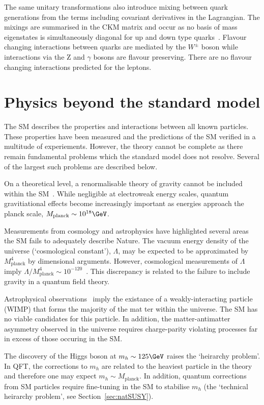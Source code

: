 The same unitary transformations also introduce mixing between quark generations from the 
terms including covariant derivatives in the Lagrangian. The mixings are summarised in the 
CKM matrix and occur as no basis of mass eigenstates is simultaneously diagonal for 
up and down type quarks~\cite{CKM}. Flavour changing
interactions between quarks are mediated by the $W^{\pm}$ boson while interactions via 
the Z and $\gamma$ bosons are flavour preserving. There are no flavour changing interactions
predicted for the leptons.

\section{Physics beyond the standard model}

The SM describes the properties and interactions between all known particles. These properties 
have been measured and the predictions of the SM verified in a multitude
of experiements. However, the theory cannot be complete 
as there remain fundamental problems which the standard model does not resolve.
Several of the largest such problems are described below.

On a theoretical level, a renormalisable theory of gravity cannot be included within 
the SM~\cite{gravRenorm}. While negligible at electroweak energy
scales, quantum gravitiational effects become increasingly important as
energies approach the planck scale, $M_{\text{planck}} \sim 10^{18} \GeV$. 

Measurements from cosmology and astrophysics have highlighted several areas
the SM fails to adequately describe Nature. The vacuum energy density 
of the universe (`cosmological constant'), $\Lambda$, 
may be expected to be approximated by $M^4_{\text{planck}}$ by dimensional 
arguments. However, cosmological measurements of $\Lambda$ imply 
$\Lambda/M_{\text{planck}}^4 \sim 10^{-120}$~\cite{cosConst}. This discrepancy
is related to the failure to include gravity in a quantum field theory.

Astrophysical observations~\cite{WIMP} imply the existance 
of a weakly-interacting particle (WIMP) that forms the majority of the mat
ter within the universe. The SM has no viable candidates for 
this particle. In addition, the matter-antimatter asymmetry observed in the universe requires 
charge-parity violating processes far in excess of those occuring in the SM.

The discovery of the Higgs boson at $m_{h}\sim125\GeV$ raises the `heirarchy problem'. In QFT, 
the corrections to $m_h$ are related to the heaviest particle in the theory and therefore
one may expect $m_h \sim M_{\text{planck}}$. In addition, quantum corrections from SM particles
require fine-tuning in the SM to stabilise $m_h$ (the `technical heirarchy problem', see Section~\ref{sec:natSUSY}).

